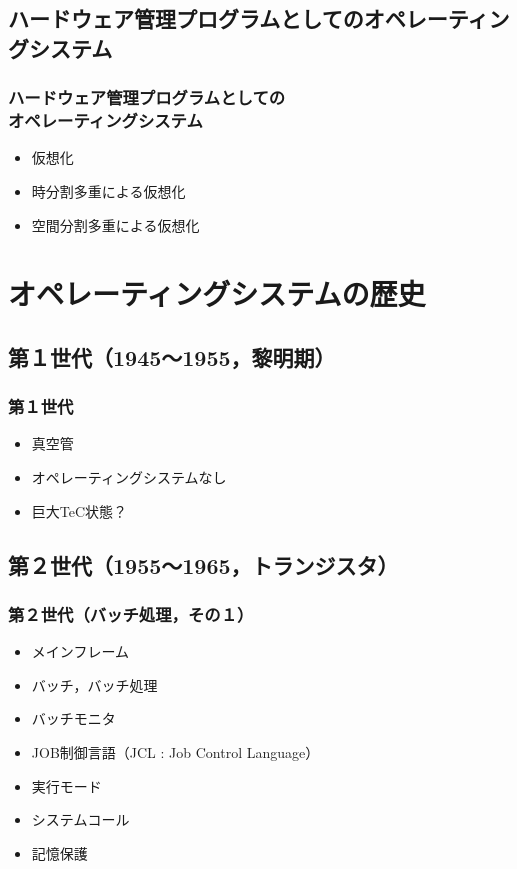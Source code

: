 \documentclass[unicode,handout]{beamer}                   %
\begin{document}
\subsection{ハードウェア管理プログラムとしてのオペレーティングシステム}
\begin{frame}
  \frametitle{ハードウェア管理プログラムとしての\\オペレーティングシステム}
  \begin{itemize}
    \item 仮想化
    \item 時分割多重による仮想化
    \item 空間分割多重による仮想化
  \end{itemize}
  \vfill
\end{frame}

\section{オペレーティングシステムの歴史}
\subsection{第１世代（1945〜1955，黎明期）}
\begin{frame}
  \frametitle{第１世代}
  \begin{itemize}
    \item 真空管
    \item オペレーティングシステムなし
    \item 巨大TeC状態？
  \end{itemize}
  \vfill
\end{frame}

\subsection{第２世代（1955〜1965，トランジスタ）}
\begin{frame}
  \frametitle{第２世代（バッチ処理，その１）}
  \begin{itemize}
    \item メインフレーム
    \item バッチ，バッチ処理
    \item バッチモニタ
    \item JOB制御言語（JCL :  Job Control Language）
    \item 実行モード
    \item システムコール
    \item 記憶保護
  \end{itemize}
  \vfill
\end{frame}
\end{document}
